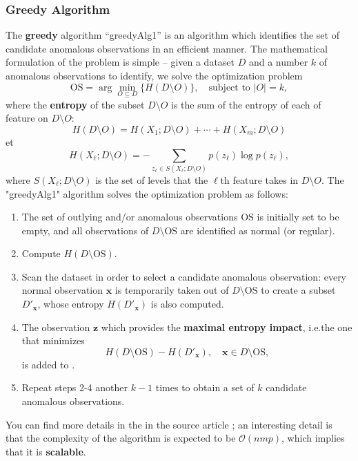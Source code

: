 \subsubsection*{Greedy Algorithm}
The \textbf{greedy} algorithm ``greedyAlg1'' is an  algorithm   which identifies the set  of candidate anomalous observations in an efficient manner. 
\newline\newline The mathematical formulation of the problem is simple -- given a dataset $D$ and a number $k$ of anomalous observations to identify, we solve the optimization problem 
$$\text{OS}=\arg\min_{O\subseteq D} \{H(D\setminus O)\}, \quad \text{subject to }|O|=k,$$
where the \textbf{entropy} of the subset  $D\setminus O$ is the sum of the entropy of each of feature on $D\setminus O$:
$$H(D\setminus O)=H(X_1;D\setminus O)+\cdots + H(X_m;D\setminus O)$$ et $$H(X_{\ell};D\setminus O)=-\!\!\!\!\!\!\!\!\!\!\!\sum_{z_{\ell}\in S(X_{\ell};D\setminus O)}\!\!\!\!\!\!\!\!\!\!\! p(z_{\ell})\log p(z_{\ell}),$$ where $S(X_{\ell};D\setminus O)$ is the set of levels that the $\ell$th feature takes in  $D\setminus O$.
\newline\newline The "greedyAlg1" algorithm solves the optimization problem as follows:
\begin{enumerate}
\item The set of outlying and/or anomalous observations $\text{OS}$ is initially set to be empty, and all observations of $D\setminus \text{OS}$ are identified as normal (or regular).
\item Compute $H(D\setminus \text{OS})$. 

\item Scan the dataset in order to select a candidate anomalous observation: every normal observation $\mathbf{x}$ is temporarily taken out of $D\setminus \text{OS}$ to create a subset $D'_{\mathbf{x}}$, whose entropy $H(D'_{\mathbf{x}})$ is also computed.
\item The observation $\mathbf{z}$ which provides the \textbf{maximal entropy impact}, i.e.\@ the one that minimizes $$H(D\setminus \text{OS})-H(D'_{\mathbf{x}}),\quad \mathbf{x}\in D\setminus \text{OS}, $$ is added to  .

\item Repeat steps 2-4 another $k-1$ times to obtain a set  of $k$ candidate anomalous observations.
\end{enumerate}

\noindent You can find more details in the in the source article \cite{Article_source}; an interesting detail is that the complexity of the algorithm is expected to be $\mathcal{O}(nmp)$, which implies that it is \textbf{scalable}.